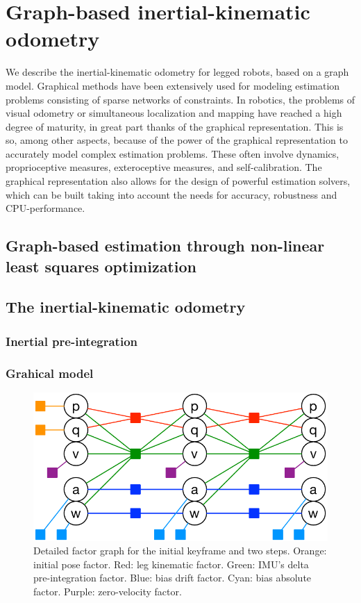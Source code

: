 
\section{Graph-based inertial-kinematic odometry}

We describe the inertial-kinematic odometry for legged robots, based on a graph model. 
Graphical methods have been extensively used for modeling estimation problems consisting of sparse networks of constraints. 
In robotics, the problems of visual odometry or simultaneous localization and mapping have reached a high degree of maturity, in great part thanks of the graphical representation. 
This is so, among other aspects, because of the power of the graphical representation to accurately model complex estimation problems. 
These often involve dynamics, proprioceptive measures, exteroceptive measures, and self-calibration. 
The graphical representation also allows for the design of powerful estimation solvers, which can be built taking into account the needs for accuracy, robustness and CPU-performance.

\subsection{Graph-based estimation through non-linear least squares optimization}

\subsection{The inertial-kinematic odometry}

\subsubsection{Inertial pre-integration}

\subsubsection{Grahical model}

\begin{figure}[tb]
\begin{center}
\includegraphics[scale=0.65]{figures/graph_exploded}
\caption{Detailed factor graph for the initial keyframe and two steps. Orange: initial pose factor. Red: leg kinematic factor. Green: IMU's delta pre-integration factor. Blue: bias drift factor. Cyan: bias absolute factor. Purple: zero-velocity factor. }
\label{default}
\end{center}
\end{figure}
